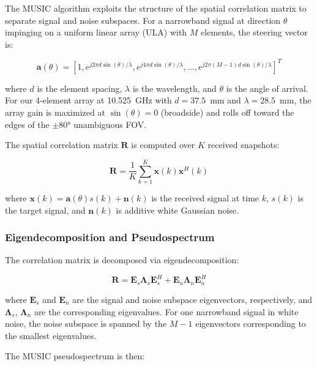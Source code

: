 \documentclass[10pt,a4paper]{article}
\begin{document}
The MUSIC algorithm exploits the structure of the spatial correlation matrix to separate
signal and noise subspaces. For a narrowband signal at direction $\theta$ impinging on a
uniform linear array (ULA) with $M$ elements, the steering vector is:

\begin{equation}
\mathbf{a}(\theta) = [1, e^{j 2\pi d \sin(\theta) / \lambda}, e^{j 4\pi d \sin(\theta) / \lambda}, \ldots, e^{j 2\pi (M-1) d \sin(\theta) / \lambda}]^T
\label{eq:steering}
\end{equation}

where $d$ is the element spacing, $\lambda$ is the wavelength, and $\theta$ is the angle
of arrival. For our 4-element array at 10.525~GHz with $d = 37.5$~mm and $\lambda = 28.5$~mm,
the array gain is maximized at $\sin(\theta) = 0$ (broadside) and rolls off toward the edges
of the $\pm 80°$ unambiguous FOV.

The spatial correlation matrix $\mathbf{R}$ is computed over $K$ received snapshots:

\begin{equation}
\mathbf{R} = \frac{1}{K} \sum_{k=1}^{K} \mathbf{x}(k) \mathbf{x}^H(k)
\label{eq:corr_matrix}
\end{equation}

where $\mathbf{x}(k) = \mathbf{a}(\theta) s(k) + \mathbf{n}(k)$ is the received signal at time $k$,
$s(k)$ is the target signal, and $\mathbf{n}(k)$ is additive white Gaussian noise.

\subsubsection{Eigendecomposition and Pseudospectrum}

The correlation matrix is decomposed via eigendecomposition:

\begin{equation}
\mathbf{R} = \mathbf{E}_s \boldsymbol{\Lambda}_s \mathbf{E}_s^H + \mathbf{E}_n \boldsymbol{\Lambda}_n \mathbf{E}_n^H
\label{eq:eigendecomp}
\end{equation}

where $\mathbf{E}_s$ and $\mathbf{E}_n$ are the signal and noise subspace eigenvectors, respectively,
and $\boldsymbol{\Lambda}_s$, $\boldsymbol{\Lambda}_n$ are the corresponding eigenvalues. For one narrowband
signal in white noise, the noise subspace is spanned by the $M-1$ eigenvectors corresponding to the
smallest eigenvalues.

The MUSIC pseudospectrum is then:
\end{document}
